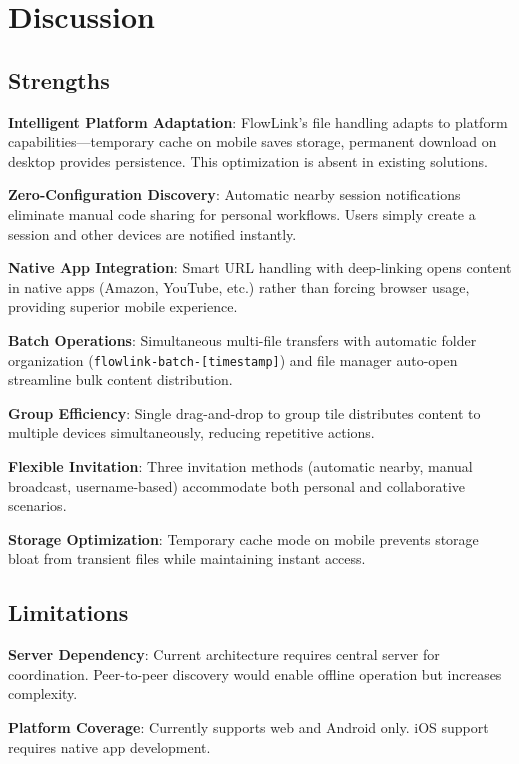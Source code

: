 \documentclass[conference]{IEEEtran}
\begin{document}
\section{Discussion}

\subsection{Strengths}

\textbf{Intelligent Platform Adaptation}: FlowLink's file handling adapts to platform capabilities—temporary cache on mobile saves storage, permanent download on desktop provides persistence. This optimization is absent in existing solutions.

\textbf{Zero-Configuration Discovery}: Automatic nearby session notifications eliminate manual code sharing for personal workflows. Users simply create a session and other devices are notified instantly.

\textbf{Native App Integration}: Smart URL handling with deep-linking opens content in native apps (Amazon, YouTube, etc.) rather than forcing browser usage, providing superior mobile experience.

\textbf{Batch Operations}: Simultaneous multi-file transfers with automatic folder organization (\texttt{flowlink-batch-[timestamp]}) and file manager auto-open streamline bulk content distribution.

\textbf{Group Efficiency}: Single drag-and-drop to group tile distributes content to multiple devices simultaneously, reducing repetitive actions.

\textbf{Flexible Invitation}: Three invitation methods (automatic nearby, manual broadcast, username-based) accommodate both personal and collaborative scenarios.

\textbf{Storage Optimization}: Temporary cache mode on mobile prevents storage bloat from transient files while maintaining instant access.

\subsection{Limitations}

\textbf{Server Dependency}: Current architecture requires central server for coordination. Peer-to-peer discovery would enable offline operation but increases complexity.

\textbf{Platform Coverage}: Currently supports web and Android only. iOS support requires native app development.
\end{document}
